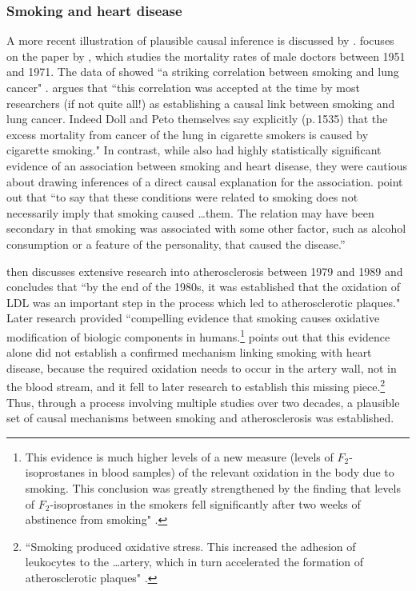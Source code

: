 \documentclass[12pt,reqno,titlepage]{amsart}
\begin{document}
\begin{doublespace}
\subsubsection{Smoking and heart disease}
A more recent illustration of plausible causal inference is discussed by \citet{Gillies2011-GILTRT-3}.
\citet{Gillies2011-GILTRT-3} focuses on the paper by \citet{Doll:1976aa}, which studies the mortality rates of male doctors between 1951 and 1971.
The data of \citet{Doll:1976aa} showed ``a striking correlation between smoking and lung cancer" \citep[p.\,111]{Gillies2011-GILTRT-3}.
\citet{Gillies2011-GILTRT-3} argues that ``this correlation was accepted at the time by most researchers (if not quite all!) as establishing a causal link between smoking and lung cancer.
Indeed Doll and Peto themselves say explicitly (p.\,1535) that the excess mortality from cancer of the lung in cigarette smokers is caused by cigarette smoking."
In contrast, while \citet{Doll:1976aa} also had highly statistically significant evidence of an association between smoking and heart disease, they were cautious about drawing inferences of a direct causal explanation for the association.
\citet[p.\,1528]{Doll:1976aa} point out that ``to say that these conditions were related to smoking does not necessarily imply that smoking caused \dots them. The relation may have been secondary in that smoking was associated with some other factor, such as alcohol consumption or a feature of the personality, that caused the disease.''

\citet{Gillies2011-GILTRT-3} then discusses extensive research into atherosclerosis between 1979 and 1989 and concludes that ``by the end of the 1980s, it was established that the oxidation of LDL was an important step in the process which led to atherosclerotic plaques."
Later research provided ``compelling evidence that smoking causes oxidative modification of biologic components in humans.\footnote{This evidence is much higher levels of a new measure (levels of $F_2$-isoprostanes in blood samples) of the relevant oxidation in the body due to smoking.
This conclusion was greatly strengthened by the finding that levels of $F_2$-isoprostanes in the smokers fell significantly after two weeks of abstinence from smoking" \citep[pp.\,1201--2]{Morrow:1995gz}.}
\citet[p.\,120]{Gillies2011-GILTRT-3} points out that this evidence alone did not establish a confirmed mechanism linking smoking with heart disease, because the required oxidation needs to occur in the artery wall, not in the blood stream, and it fell to later research to establish this missing piece.\footnote{
``Smoking produced oxidative stress. 
This increased the adhesion of leukocytes to the \dots artery, which in turn accelerated the formation of atherosclerotic plaques" \citep[p.\,123]{Gillies2011-GILTRT-3}.}
Thus, through a process involving multiple studies over two decades, a plausible set of causal mechanisms between smoking and atherosclerosis was established.


\end{doublespace}
\end{document}
